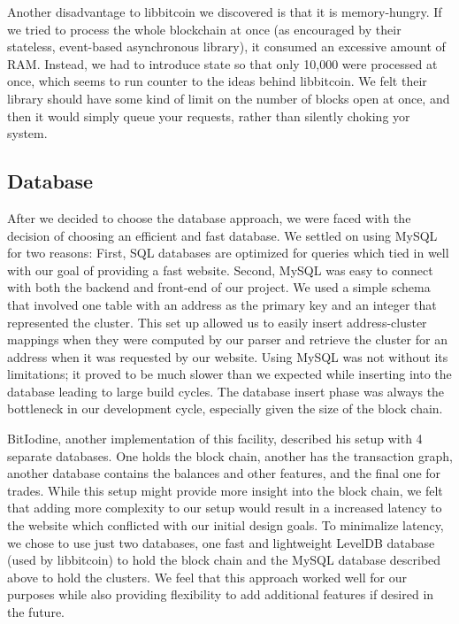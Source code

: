 \documentclass[10pt, letterpaper, twocolumn, twoside]{article}
\begin{document}
Another disadvantage to libbitcoin we discovered is that it is memory-hungry. If we tried to process the whole blockchain at once (as encouraged by their stateless, event-based asynchronous library), it consumed an excessive amount of RAM. Instead, we had to introduce state so that only 10,000 were processed at once, which seems to run counter to the ideas behind libbitcoin. We felt their library should have some kind of limit on the number of blocks open at once, and then it would simply queue your requests, rather than silently choking yor system.

\subsection{Database}

After we decided to choose the database approach, we were faced with the decision of choosing an efficient and fast database. We settled on using MySQL for two reasons: First, SQL databases are optimized for queries which tied in well with our goal of providing a fast website. Second, MySQL was easy to connect with both the backend and front-end of our project. We used a simple schema that involved one table with an address as the primary key and an integer that represented the cluster. This set up allowed us to easily insert address-cluster mappings when they were computed by our parser and retrieve the cluster for an address when it was requested by our website. Using MySQL was not without its limitations; it proved to be much slower than we expected while inserting into the database leading to large build cycles. The database insert phase was always the bottleneck in our development cycle, especially given the size of the block chain.

BitIodine, another implementation of this facility, described his setup with 4 separate databases. One holds the block chain, another has the transaction graph, another database contains the balances and other features, and the final one for trades. While this setup might provide more insight into the block chain, we felt that adding more complexity to our setup would result in a increased latency to the website which conflicted with our initial design goals. To minimalize latency, we chose to use just two databases, one fast and lightweight LevelDB database (used by libbitcoin) to hold the block chain and the MySQL database described above to hold the clusters. We feel that this approach worked well for our purposes while also providing flexibility to add additional features if desired in the future.
\end{document}
